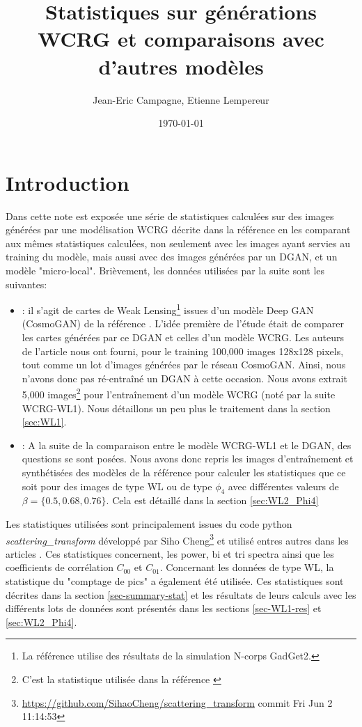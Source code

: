 \documentclass[12pt,twoside]{article}
\title{Statistiques sur générations WCRG et comparaisons avec d'autres modèles}
\author{Jean-Eric Campagne, Etienne Lempereur}
\date{\today}
\begin{document}
\maketitle
\renewcommand{\baselinestretch}{0.75}\normalsize
\tableofcontents
\renewcommand{\baselinestretch}{1.0}\normalsize

\section{Introduction}
Dans cette note est exposée une série de statistiques calculées sur des images générées par une modélisation WCRG décrite dans la référence \cite{2023arXiv230600181G} en les comparant aux mêmes statistiques calculées, non seulement avec les images ayant servies au training du modèle, 
mais aussi avec des images générées par un DGAN, et un modèle "micro-local".
Brièvement, les données utilisées par la suite sont les suivantes: 
\begin{itemize}
\item[WL-1]: il s'agit de cartes de  Weak Lensing\footnote{La référence utilise des résultats de la simulation N-corps GadGet2.} issues d'un modèle Deep GAN (CosmoGAN) de la référence \cite{2019ComAC...6....1M}. L'idée première de l'étude était de comparer les cartes générées par ce DGAN et celles d'un modèle WCRG. Les auteurs de l'article nous ont fourni, pour le training  100,000 images 128x128 pixels, tout comme un lot d'images générées par le réseau CosmoGAN. Ainsi, nous n'avons donc pas ré-entraîné un DGAN à cette occasion. Nous avons extrait 5,000 images\footnote{C'est la statistique utilisée dans la référence \citep{2023arXiv230600181G}} pour l'entraînement d'un modèle WCRG (noté par la suite WCRG-WL1). Nous détaillons un peu plus le traitement dans la section \ref{sec:WL1}.
\item[WL-2 \& $\phi_4$]:  A la suite de la comparaison entre le modèle WCRG-WL1 et le DGAN, des questions se sont posées.  Nous avons donc repris les images d'entraînement et synthétisées des modèles de la référence \cite{2023arXiv230600181G} pour calculer les statistiques que ce soit pour des images de type WL ou de type $\phi_4$ avec différentes valeurs de $\beta=\{0.5, 0.68, 0.76\}$. Cela est détaillé dans la section \ref{sec:WL2_Phi4}
\end{itemize}
\hfill

Les statistiques utilisées sont principalement issues du code python \textit{scattering\_transform} développé par Siho Cheng\footnote{\url{https://github.com/SihaoCheng/scattering_transform} commit Fri Jun 2 11:14:53}
et utilisé entres autres dans les articles \cite{2021arXiv211201288C, 2023arXiv230617210C}. Ces statistiques concernent, les power, bi et tri spectra ainsi que les coefficients de corrélation $C_{00}$ et $C_{01}$. Concernant les données de type WL, la statistique du "comptage de pics" a également été utilisée. Ces statistiques sont décrites dans la section \ref{sec-summary-stat} et les résultats de leurs calculs avec les différents lots de données sont présentés dans les sections \ref{sec-WL1-res} et  \ref{sec:WL2_Phi4}.
\end{document}
